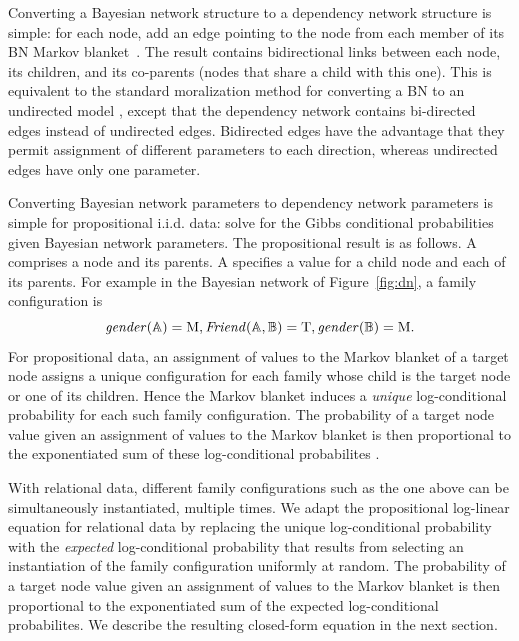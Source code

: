 \documentclass[runningheads,a4paper]{llncs}
\newcommand{\iid}{i.i.d.}
\begin{document}
Converting a Bayesian network structure to a dependency network structure is simple: for each node, add an edge pointing to the node from each member of its BN Markov blanket~\cite{Heckerman2000}.  The result contains  bidirectional links between each node, its children, and its co-parents (nodes that share a child with this one). 
%
This is equivalent to the standard moralization  method for converting a BN to an undirected model \cite{Domingos2009}, except that the dependency network contains bi-directed edges instead of undirected edges. Bidirected edges have the advantage that they permit  assignment of different parameters to each direction, whereas undirected edges have only one parameter.
 
Converting Bayesian network parameters to dependency network parameters is simple for propositional \iid{} data: solve for the Gibbs conditional probabilities given Bayesian network parameters. The propositional result is as follows. A  comprises a node and its parents. A  specifies a value for a child node and each of its parents. For example in the Bayesian network of Figure~\ref{fig:dn}, a family configuration is 
$$\it{gender}(\mathbb{A}) = \mathrm{M}, \it{Friend}(\mathbb{A},\mathbb{B}) = \mathrm{T}, \it{gender}(\mathbb{B}) = \mathrm{M}.$$
For propositional data, an assignment of values to the Markov blanket of a target node assigns a unique configuration for each family whose child is the target node or one of its children. Hence the Markov blanket induces a {\em unique} log-conditional probability for each such family configuration. The probability of a target node value given an assignment of values to the Markov blanket is then proportional to the exponentiated sum of these log-conditional probabilites \cite[Ch.14.5.2]{Russell2010}. 

With relational data, different family configurations such as the one above can be simultaneously instantiated, multiple times.  We adapt the propositional log-linear equation for relational data by replacing the unique log-conditional probability with the {\em expected} log-conditional probability that results from selecting an instantiation of the family configuration uniformly at random. The probability of a target node value given an assignment of values to the Markov blanket is then proportional to the exponentiated sum of the expected log-conditional probabilites. %
We describe the resulting closed-form equation in the next section.
\end{document}
